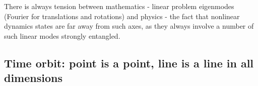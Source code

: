         There is always tension between mathematics - linear problem eigenmodes
        (Fourier for translations and rotations) and physics - the fact that
        nonlinear dynamics states are far away from such axes, as they
        always involve a number of such linear modes strongly entangled.

\subsection{Time orbit: point is a point, line is a line in all dimensions}
\label{sect:TimeOrb}


    \color{black}\fi
